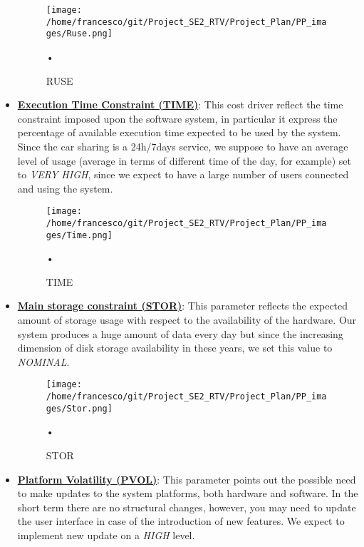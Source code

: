 \documentclass[10pt, a4paper,titlepage]{article}
\begin{document}
\begin{itemize}
\begin{figure}[h]
\begin{center}
\texttt{[image: /home/francesco/git/Project\_SE2\_RTV/Project\_Plan/PP\_images/Ruse.png]}
\caption{RUSE}
\label{fig:RUSE}
\end{center}•
\end{figure}
\pagebreak
\item \underline{\textbf{Execution Time Constraint (TIME)}}: This cost driver reflect the time constraint imposed upon the software system, in particular it express the percentage of available execution time expected to be used by the system. Since the car sharing is a 24h/7days service, we suppose to have an average level of usage (average in terms of different time of the day, for example) set to \emph{VERY HIGH}, since we expect to have a large number of users connected and using the system.
\begin{figure}[h]
\begin{center}
\texttt{[image: /home/francesco/git/Project\_SE2\_RTV/Project\_Plan/PP\_images/Time.png]}
\caption{TIME}
\label{fig:TIME}
\end{center}•
\end{figure}
\linebreak
\item \underline{\textbf{Main storage constraint (STOR)}}: This parameter reflects the expected amount of storage usage with respect to the availability of the hardware. Our system produces a huge amount of data every day but since the increasing dimension of disk storage availability in these years, we set this value to \emph{NOMINAL}.
\begin{figure}[h]
\begin{center}
\texttt{[image: /home/francesco/git/Project\_SE2\_RTV/Project\_Plan/PP\_images/Stor.png]}
\caption{STOR}
\label{fig:STOR}
\end{center}•
\end{figure}
\pagebreak
\item \underline{\textbf{Platform Volatility (PVOL)}}: This parameter points out the possible need to make updates to the system platforms, both hardware and software. In the short term there are no structural changes, however, you may need to update the user interface in case of the introduction of new features. We expect to implement new update on a \emph{HIGH} level.
\begin{figure}[h]

\end{figure}
\end{itemize}
\end{document}
